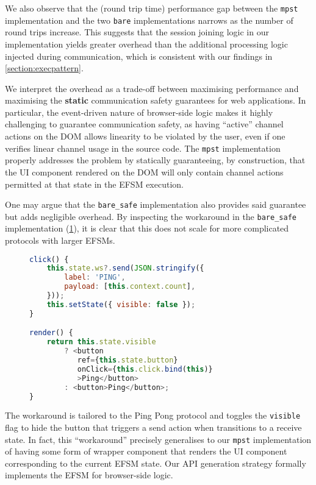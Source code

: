 We also observe that the (round trip time) performance gap between 
the \texttt{mpst} implementation and the two 
\texttt{bare} implementations narrows as the number of round trips 
increase. This suggests that the session joining logic in our
implementation yields greater overhead than the additional processing
logic injected during communication, which is consistent with 
our findings in \cref{section:execpattern}.

We interpret the overhead as a trade-off between maximising performance and
maximising the \textbf{static} communication safety guarantees for
web applications. In particular, the event-driven nature of 
browser-side logic makes it highly challenging to guarantee 
communication safety, as having ``active'' channel actions on the DOM
allows linearity to be violated by the user, even if one verifies
linear channel usage in the source code. The \texttt{mpst} implementation
properly addresses the problem by statically guaranteeing,
by construction, that the UI component rendered on the DOM will only
contain channel actions permitted at that state in the EFSM execution.

One may argue that the \texttt{bare_safe} implementation also
provides said guarantee but adds negligible overhead. 
By inspecting the workaround in the \texttt{bare_safe} implementation
(\cref{lst:workaround}),
it is clear that this does not scale for more complicated protocols with
larger EFSMs. 

\begin{figure}[!ht]
\begin{lstlisting}[language=javascript, tabsize=2]
click() {
	this.state.ws?.send(JSON.stringify({
		label: 'PING',
		payload: [this.context.count],
	}));
	this.setState({ visible: false });
}

render() {
	return this.state.visible 
		? <button
		   ref={this.state.button}
		   onClick={this.click.bind(this)}
		   >Ping</button>
		: <button>Ping</button>;
}
\end{lstlisting}
\label{lst:workaround}
\end{figure}

The workaround is tailored to the Ping Pong protocol
and toggles the \texttt{visible} flag to hide the button that triggers
a send action when  transitions to a receive state.
In fact, this ``workaround'' precisely generalises to our 
\texttt{mpst} implementation of having some form of wrapper
component that renders the UI component corresponding to the
current EFSM state. Our API generation strategy formally implements
the EFSM for browser-side logic.

